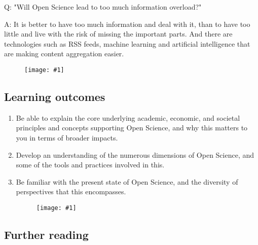 \documentclass{article}
\newlength{\imgwidth}
\newcommand\scaledgraphics[2]{%
                
\settowidth{\imgwidth}{\texttt{[image: \#1]}}%
                
\setlength{\imgwidth}{\minof{\imgwidth}{#2\textwidth}}%
                
\texttt{[image: \#1]}%
                
}
\begin{document}
Q: "Will Open Science lead to too much information overload?"


A: It is better to have too much information and deal with it, than to have too little and live with the risk of missing the important parts. And there are technologies such as RSS feeds, machine learning and artificial intelligence that are making content aggregation easier.

\begin{figure}
\scaledgraphics{78242a58-956c-4a6f-8d50-a93e47eb21b4.png}{1}
\label{F63330101}
\end{figure}


\subsection{Learning outcomes}\label{learning-outcomes}


\begin{enumerate}
\item Be able to explain the core underlying academic, economic, and societal principles and concepts supporting Open Science, and why this matters to you in terms of broader impacts.


\item Develop an understanding of the numerous dimensions of Open Science, and some of the tools and practices involved in this.


\item Be familiar with the present state of Open Science, and the diversity of perspectives that this encompasses.

\begin{figure}
\scaledgraphics{28184297-5028-4ac9-bc5f-7a459edf50cf.png}{1}
\label{F13281331}
\end{figure}


\end{enumerate}

\subsection{Further reading}\label{further-reading}
\end{document}
